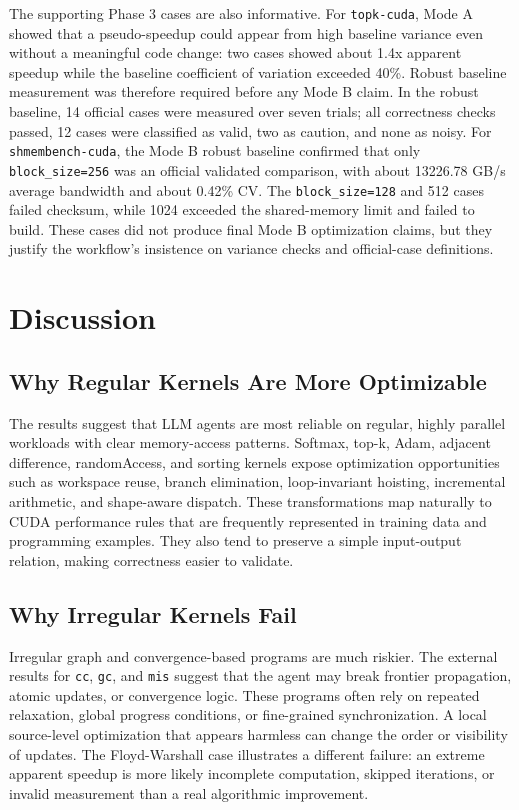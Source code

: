 \documentclass[conference]{IEEEtran}
\begin{document}
The supporting Phase 3 cases are also informative. For \texttt{topk-cuda}, Mode A showed that a pseudo-speedup could appear from high baseline variance even without a meaningful code change: two cases showed about 1.4x apparent speedup while the baseline coefficient of variation exceeded 40\%. Robust baseline measurement was therefore required before any Mode B claim. In the robust baseline, 14 official cases were measured over seven trials; all correctness checks passed, 12 cases were classified as valid, two as caution, and none as noisy. For \texttt{shmembench-cuda}, the Mode B robust baseline confirmed that only \texttt{block\_size=256} was an official validated comparison, with about 13226.78 GB/s average bandwidth and about 0.42\% CV. The \texttt{block\_size=128} and 512 cases failed checksum, while 1024 exceeded the shared-memory limit and failed to build. These cases did not produce final Mode B optimization claims, but they justify the workflow's insistence on variance checks and official-case definitions.

\section{Discussion}
\label{sec:discussion}

\subsection{Why Regular Kernels Are More Optimizable}

The results suggest that LLM agents are most reliable on regular, highly parallel workloads with clear memory-access patterns. Softmax, top-k, Adam, adjacent difference, randomAccess, and sorting kernels expose optimization opportunities such as workspace reuse, branch elimination, loop-invariant hoisting, incremental arithmetic, and shape-aware dispatch. These transformations map naturally to CUDA performance rules that are frequently represented in training data and programming examples. They also tend to preserve a simple input-output relation, making correctness easier to validate.

\subsection{Why Irregular Kernels Fail}

Irregular graph and convergence-based programs are much riskier. The external results for \texttt{cc}, \texttt{gc}, and \texttt{mis} suggest that the agent may break frontier propagation, atomic updates, or convergence logic. These programs often rely on repeated relaxation, global progress conditions, or fine-grained synchronization. A local source-level optimization that appears harmless can change the order or visibility of updates. The Floyd-Warshall case illustrates a different failure: an extreme apparent speedup is more likely incomplete computation, skipped iterations, or invalid measurement than a real algorithmic improvement.
\end{document}
